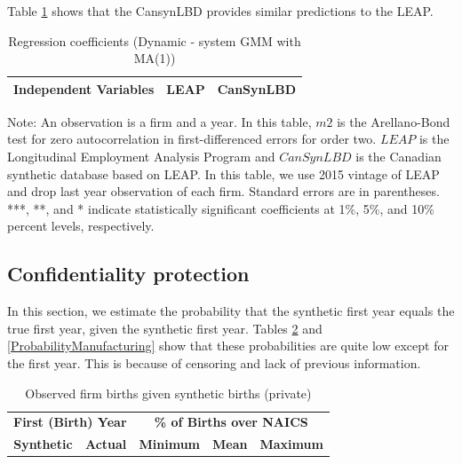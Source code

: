 \documentclass{article}
\begin{document}
Table \ref{Dynamic - system GMM with MA(1)} shows that the CansynLBD provides similar predictions to the LEAP.

\begin{table}[H]
  \centering
\begin{threeparttable}
 \caption{Regression coefficients (Dynamic - system GMM with MA(1))} \label{Dynamic - system GMM with MA(1)} \medskip
\renewcommand{\arraystretch}{1}
\begin{tabular}{l|c c| c c}
\toprule
\textbf{Independent Variables}&\multicolumn{2}{c|}{\textbf{LEAP}} &  \multicolumn{2}{c}{\textbf{CanSynLBD}}\\
\midrule

   \bottomrule
  \end{tabular} 
\begin{tablenotes}
\small
\item Note: An observation is a firm and a year. In this table, $m2$ is the Arellano-Bond test for zero autocorrelation in first-differenced errors for order two. $LEAP$ is the Longitudinal Employment Analysis Program and $CanSynLBD$ is the Canadian synthetic database based on LEAP. In this table, we use 2015 vintage of LEAP and drop last year observation of each firm. Standard errors are in parentheses. ***, **, and * indicate statistically significant coefficients at 1\%, 5\%, and 10\% percent levels, respectively.
 \end{tablenotes}
 \end{threeparttable}
\end{table}

\subsection{Confidentiality protection}

In this section, we estimate the probability that the synthetic first year equals the true first year, given the synthetic first year. Tables \ref{ProbabilityPrivate} and \ref{ProbabilityManufacturing} show that these probabilities are quite low except for the first year. This is because of censoring and lack of previous information.

\begin{table}[H]
\centering\footnotesize
\caption{Observed firm births given synthetic births (private)} \label{ProbabilityPrivate} \medskip
\renewcommand{\arraystretch}{1}
\begin{tabular}{c c| c c c}
\toprule
\multicolumn{2}{c|}{\textbf{First (Birth) Year}} &  \multicolumn{3}{c}{\textbf{\% of Births over NAICS}}\\
\textbf{Synthetic}&\textbf{Actual}&\textbf{Minimum}&\textbf{Mean}&\textbf{Maximum}\\
\midrule

\bottomrule
\end{tabular} 
\\
\justify
\end{table}
\end{document}
